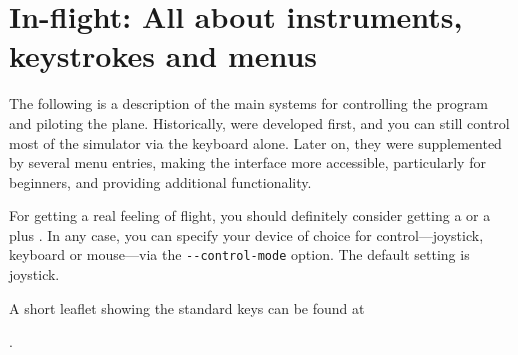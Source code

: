 
\chapter{In-flight: All about instruments, keystrokes and menus\label{flight}}

The following is a description of the main systems for controlling the
program and piloting the plane. Historically,  were
developed
first, and you can still control most of the simulator via the keyboard alone.
Later on,
they were supplemented by several menu entries, making the interface more
accessible,
particularly for beginners, and providing additional functionality.

For getting a real feeling of flight, you should definitely consider
getting a  or a  plus
. In any case, you can specify your device of
choice for control---joystick, keyboard or mouse---via the \texttt{-$ $-control-mode} option.  The default setting is joystick.

A short leaflet showing the standard keys can be found at
 \medskip

.
 \medskip

